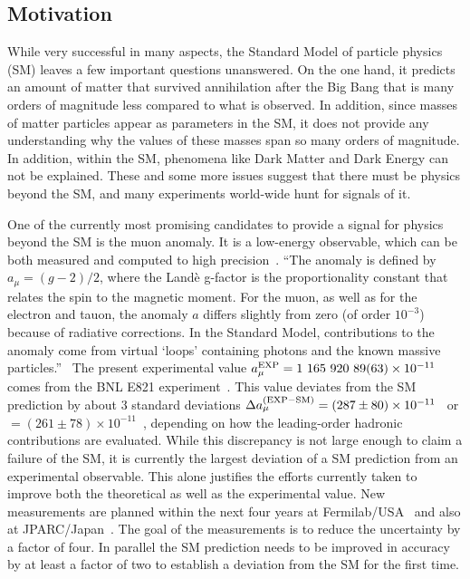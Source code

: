 \documentclass[11pt,a4paper,twocolumn]{article}
\begin{document}
\subsection{Motivation}
While very successful in many aspects, the Standard Model of particle physics (SM)
leaves a few important questions unanswered. On the one hand, it predicts
an amount of matter that survived annihilation after the Big Bang that is many orders
of magnitude less compared to what is observed. In addition, since masses
of matter particles appear as parameters in the SM, it does not provide any understanding
why the values of these masses span so many orders of magnitude.
In addition, within the SM, phenomena like Dark Matter and Dark Energy can not be explained.
These and some more 
issues suggest that there must be physics beyond the SM, and many experiments
world-wide hunt for signals of it. 

One of the currently most promising candidates to provide a signal for physics beyond the SM
is the muon anomaly. It is a low-energy observable, which
can be both measured and computed to high precision~\cite{Jegerlehner:2009ry,Blum:2013xva}.
``The anomaly is defined by $a_\mu = (g-2)/2$, where the Land\`e g-factor is the proportionality constant that relates the spin to the magnetic moment.
For the muon, as well as for the electron and tauon,
the anomaly $a$ differs slightly from zero (of order $10^{-3}$)
because of radiative corrections. In the Standard Model, contributions to the anomaly come from virtual `loops' containing photons and the known massive particles.''~\cite{miller} 
The present experimental value $a_\mu^{\rm EXP}= 1\ 165\ 920\ 89 (63)\times 10^{-11}$
comes from the BNL E821 experiment~\cite{Bennett:2006fi}.  This value
deviates from the SM prediction by about 3 standard
deviations $\Delta a_\mu^{({\rm EXP-SM})}= (287\pm 80)\times 10^{-11}$~\cite{Davier:2010nc} 
or $= (261\pm 78)\times 10^{-11}$~\cite{Hagiwara:2011af}, depending on how the leading-order
hadronic contributions are evaluated.  While this discrepancy
is not large enough to claim a failure of the SM, it is currently the largest
deviation of a SM prediction from an experimental observable. This
alone justifies the efforts currently taken to improve both the theoretical as well as the experimental value.
New measurements are planned within the next four years at 
Fermilab/USA~\cite{Grange:2015fou} and also at JPARC/Japan~\cite{Saito:2012zz}. The goal
of the measurements is to reduce the uncertainty by a factor of four. 
In parallel the SM prediction needs to be improved in accuracy 
by at least a factor of two to establish a deviation from the SM for the first time.
\end{document}
